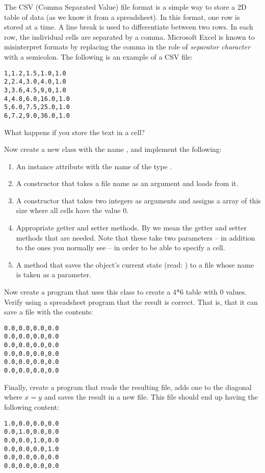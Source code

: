 The CSV (Comma Separated Value) file format is a simple way to store a 2D table of data (as we know it from a spreadsheet). In this format, one row is stored at a time. A line break is used to differentiate between two rows. In each row, the individual cells are separated by a comma. Microsoft Excel is known to misinterpret formats by replacing the comma in the role of \textsl{separator character} with a semicolon. The following is an example of a CSV file:

\begin{verbatim}
1,1.2,1.5,1.0,1.0
2,2.4,3.0,4.0,1.0
3,3.6,4.5,9,0,1.0
4,4.8,6.0,16.0,1.0
5,6.0,7.5,25.0,1.0
6,7.2,9.0,36.0,1.0
\end{verbatim}

What happens if you store the text  in a cell?

Now create a new class with the name , and implement the following:
\begin{enumerate}
  \item An instance attribute with the name  of the type .
  \item A constructor that takes a file name as an argument and loads  from it.
  \item A constructor that takes two integers as arguments and assigns  a  array of this size where all cells have the value 0.
  \item Appropriate getter and setter methods. By  we mean the getter and setter methods that are needed. Note that these take two  parameters -- in addition to the ones you normally see -- in order to be able to specify a cell.
  \item A  method that saves the object's current state (read: ) to a file whose name is taken as a parameter.
\end{enumerate}

Now create a program that uses this class to create a 4*6 table with 0 values. Verify using a spreadsheet program that the result is correct. That is, that it can save a file with the contents:

\begin{verbatim}
0.0,0.0,0.0,0.0
0.0,0.0,0.0,0.0
0.0,0.0,0.0,0.0
0.0,0.0,0.0,0.0
0.0,0.0,0.0,0.0
0.0,0.0,0.0,0.0
\end{verbatim}

Finally, create a program that reads the resulting file, adds one to the diagonal where $x=y$ and saves the result in a new file. This file should end up having the following content:

\begin{verbatim}
1.0,0.0,0.0,0.0
0.0,1.0,0.0,0.0
0.0,0.0,1.0,0.0
0.0,0.0,0.0,1.0
0.0,0.0,0.0,0.0
0.0,0.0,0.0,0.0
\end{verbatim}

